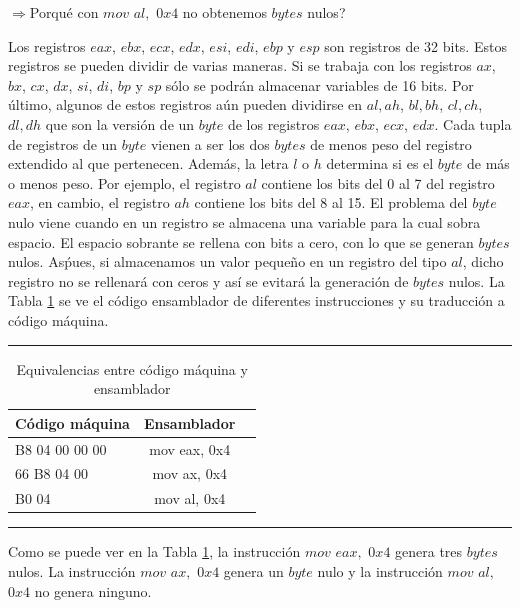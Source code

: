 \documentclass [titlepage, 12pt]{article}
\newcommand{\topfigrule}{\hrule\vspace{4 pt}}
\newcommand{\botfigrule}{\hrule\vspace{4 pt}}
\begin{document}
\begin{math}\Rightarrow\end{math}Porqu\'e con $mov$ $al,$ $0x4$ no obtenemos $bytes$ nulos?\bigskip

Los registros $eax$, $ebx$, $ecx$, $edx$, $esi$, $edi$, $ebp$ y $esp$ son registros de 32 bits. Estos registros se pueden dividir de varias maneras. Si se trabaja con los registros $ax$, $bx$, $cx$, $dx$, $si$, $di$, $bp$ y $sp$ s\'olo se podr\'an almacenar variables de 16 bits. Por \'ultimo, algunos de estos registros a\'un pueden dividirse en $al,ah$, $bl,bh$, $cl,ch$, $dl,dh$ que son la versi\'on de un $byte$ de los registros $eax$, $ebx$, $ecx$, $edx$. Cada tupla de registros de un $byte$ vienen a ser los dos $bytes$ de menos peso del registro extendido al que pertenecen. Adem\'as, la letra $l$ o $h$ determina si es el $byte$ de m\'as o menos peso. Por ejemplo, el registro $al$ contiene los bits del 0 al 7 del registro $eax$, en cambio, el registro $ah$ contiene los bits del 8 al 15.
El problema del $byte$ nulo viene cuando en un registro se almacena una variable para la cual sobra espacio. El espacio sobrante se rellena con bits a cero, con lo que se generan $bytes$ nulos. As\' pues, si almacenamos un valor peque\~no en un registro del tipo $al$, dicho registro no se rellenar\'a con ceros y as\'i se evitar\'a la generaci\'on de $bytes$ nulos. La Tabla  \ref{tab:equivalencias2} se ve el c\'odigo ensamblador de diferentes instrucciones y su traducci\'on a c\'odigo m\'aquina.   

\begin{table}[!htp]
	\topfigrule
   	\addtolength{\abovecaptionskip}{-12pt}   	
   	\caption{Equivalencias entre c\'odigo m\'aquina y ensamblador}
   	\label{tab:equivalencias2} 	
   	\begin{center}
	\begin{tabular}{||l | c | r||}
		\hline
		\hline
		C\'odigo m\'aquina & Ensamblador \\
		\hline
		B8 04 00 00 00 & mov eax, 0x4\\
		\hline
		66 B8 04 00 & mov ax, 0x4\\
		\hline
		B0 04 & mov al, 0x4\\
		\hline
	\end{tabular}
	\end{center} \botfigrule
\end{table}

Como se puede ver en la Tabla \ref{tab:equivalencias2}, la instrucci\'on $mov$ $eax,$ $0x4$ genera tres $bytes$ nulos. La instrucci\'on $mov$ $ax,$ $0x4$ genera un $byte$ nulo y la instrucci\'on $mov$ $al,$ $0x4$ no genera ninguno. \pagebreak
\end{document}
